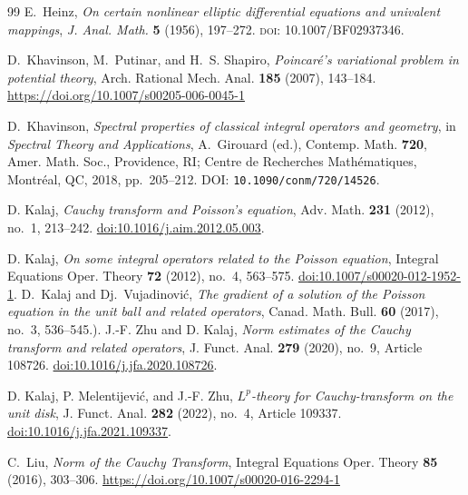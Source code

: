 \documentclass{amsart}
\theoremstyle{plain}
\theoremstyle{remark}
\begin{document}
\begin{thebibliography}{99}
E.~Heinz,
\newblock \emph{On certain nonlinear elliptic differential equations and univalent mappings},
\newblock \emph{J. Anal. Math.} \textbf{5} (1956), 197--272.
\newblock \textsc{doi}: 10.1007/BF02937346.

D.~Khavinson, M.~Putinar, and H.~S. Shapiro,
\emph{Poincar\'e's variational problem in potential theory},
Arch. Rational Mech. Anal. \textbf{185} (2007), 143--184.
\url{https://doi.org/10.1007/s00205-006-0045-1}

D.~Khavinson,
\newblock \emph{Spectral properties of classical integral operators and geometry},
\newblock in \emph{Spectral Theory and Applications},
A.~Girouard (ed.), Contemp. Math. \textbf{720},
Amer. Math. Soc., Providence, RI; Centre de Recherches Math\'ematiques, Montr\'eal, QC, 2018,
pp.~205--212.
\newblock DOI: \texttt{10.1090/conm/720/14526}.

D. Kalaj,
\emph{Cauchy transform and Poisson's equation},
Adv. Math. \textbf{231} (2012), no.~1, 213--242.
\href{https://doi.org/10.1016/j.aim.2012.05.003}{doi:10.1016/j.aim.2012.05.003}.

D. Kalaj,
\emph{On some integral operators related to the Poisson equation},
Integral Equations Oper. Theory \textbf{72} (2012), no.~4, 563--575.
\href{https://doi.org/10.1007/s00020-012-1952-1}{doi:10.1007/s00020-012-1952-1}.
D.~Kalaj and Dj.~Vujadinovi\'c,
\emph{The gradient of a solution of the Poisson equation in the unit ball and related operators},
Canad. Math. Bull. \textbf{60} (2017), no.~3, 536--545.).
J.-F. Zhu and D. Kalaj,
\emph{Norm estimates of the Cauchy transform and related operators},
J. Funct. Anal. \textbf{279} (2020), no.~9, Article 108726.
\href{https://doi.org/10.1016/j.jfa.2020.108726}{doi:10.1016/j.jfa.2020.108726}.

D. Kalaj, P. Melentijevi\'c, and J.-F. Zhu,
\emph{$L^p$-theory for Cauchy-transform on the unit disk},
J. Funct. Anal. \textbf{282} (2022), no.~4, Article 109337.
\href{https://doi.org/10.1016/j.jfa.2021.109337}{doi:10.1016/j.jfa.2021.109337}.



C.~Liu,
\emph{Norm of the Cauchy Transform},
Integral Equations Oper. Theory \textbf{85} (2016), 303--306.
\url{https://doi.org/10.1007/s00020-016-2294-1}


\end{thebibliography}
\end{document}
